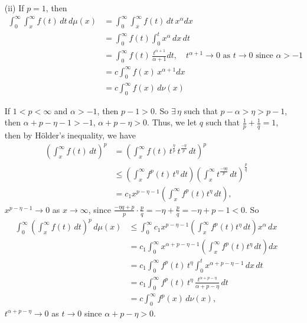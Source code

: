 \documentclass[a4paper,11pt]{article}
\begin{document}
\begin{enumerate}
		\item [(ii)]
			If $p = 1$, then
				$$\begin{aligned}
				\int_0^\infty \int_x^\infty f(t)\,dt\,d\mu(x)
				&= \int_0^\infty \int_x^\infty f(t)\,dt\,x^\alpha dx\\
				&= \int_0^\infty f(t) \int_0^t x^\alpha \,dx\,dt\\
				&= \int_0^\infty f(t) \, \frac{t^{\alpha+1}}{\alpha + 1} dt,
				\quad \text{$t^{\alpha + 1} \to 0$ as $t \to 0$ since $\alpha > -1$}\\
				&= c \int_0^\infty f(x)\,x^{\alpha + 1} dx\\
				&= c \int_0^\infty f(x)\,d\nu(x)
				\end{aligned}$$

			If $1 < p < \infty$ and $\alpha > -1$, then $p - 1 > 0$. So $\exists\,\eta$ such that $p - \alpha > \eta > p - 1$, then $\alpha + p - \eta - 1 > -1$, $\alpha + p - \eta > 0$. Thus, we let $q$ such that $\frac{1}{p} + \frac{1}{q} = 1$, then by H\"older's inequality, we have
				$$\begin{aligned}
				\left( \int_x^\infty f(t)\,dt \right)^p
				&= \left( \int_x^\infty f(t)\,t^{\frac{\eta}{p}}\,t^{\frac{-\eta}{p}}\,dt \right)^p\\
				&\leq \left( \int_x^\infty f^p(t) \,t^\eta\,dt\right) \left(\int_x^\infty t^{\frac{-\eta q}{p}}\,dt \right)^{\frac{p}{q}}\\
				&= c_1 x^{p - \eta - 1} \left( \int_x^\infty f^p(t) t^\eta\,dt \right),
				\end{aligned}$$
			$x^{p - \eta - 1} \to 0$ as $x \to \infty$, since $\frac{-\eta q + p}{p} \cdot \frac{p}{q} = -\eta + \frac{p}{q} = -\eta + p - 1 < 0$. So
				$$\begin{aligned}
				\int_0^\infty (\int_x^\infty f(t)\,dt)^p\,d\mu(x)
				&\leq \int_0^\infty c_1 x^{p - \eta - 1} \left( \int_x^\infty f^p(t) t^\eta\,dt \right) x^\alpha\,dx\\
				&= c_1 \int_0^\infty x^{\alpha + p - \eta -1} \left( \int_x^\infty f^p(t) t^\eta\,dt \right) dx\\
				&= c_1 \int_0^\infty f^p(t)\,t^\eta \int_0^t x^{\alpha + p - \eta -1} \,dx\,dt\\
				&= c_1 \int_0^\infty f^p(t)\,t^\eta \, \frac{t^{\alpha + p - \eta}}{\alpha + p - \eta} \,dt\\
				&= c \int_0^\infty f^p(x) \,d\nu(x),
				\end{aligned}$$
			$t^{\alpha + p - \eta} \to 0$ as $t \to 0$ since $\alpha + p - \eta > 0$.\\

	\end{enumerate}
\end{document}
